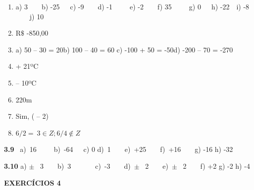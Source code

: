 \documentclass[12pt]{article}
\renewcommand{\_}{\kern-1.5pt\textunderscore\kern-1.5pt}
\begin{document}
\vspace{\baselineskip}
\setlength{\parskip}{9.96pt}
\begin{enumerate}
	\item  a) 3\ \ \ \  b) -25\ \  \  c) -9\ \ \ \  d) -1\ \ \ \ \  e) -2\ \ \ \  f) 35\ \ \ \ \  g) 0\ \  \  h) -22\  \   i) -8 \ \ \ \  j) 10\par

	\item R$\$$  -850,00\par

	\item a) 50 – 30 = 20\tab b) 100 – 40 = 60  \tab c) -100 + 50 = -50\tab d) -200 – 70 = -270\par

	\item + 21ºC\par

	\item – 10ºC \par

	\item 220m\par

	\item Sim, ( – 2)\par

	\item  \( 6/2=~3   \in Z;6/4 \notin  Z \)  
\end{enumerate}\par

\setlength{\parskip}{8.04pt}
\begin{adjustwidth}{0.3in}{0.0in}
\textbf{3.9 } \  a)\ 16\ \ \ \ \ b)\ -64\ \ \  c) 0     d)\ 1\ \   \ \  e)\ +25\ \ \ \ f)\ +16\ \ \ \ g) -16     h) -32\par

\end{adjustwidth}

\begin{adjustwidth}{0.3in}{0.0in}
\textbf{3.10  }a) $ \pm $ \ 3\ \ \ \ b)\ 3\ \ \ \ \ \ \ c)\ -3\ \ \ \ d)\ $ \pm $ \ 2\ \ \ \ e)\ $ \pm $ \ 2\ \ \ \  f) +2      g) -2       h) -4\par

\end{adjustwidth}


\vspace{\baselineskip}
\begin{adjustwidth}{0.3in}{0.0in}
\textbf{EXERCÍCIOS 4}\par

\end{adjustwidth}
\end{document}
